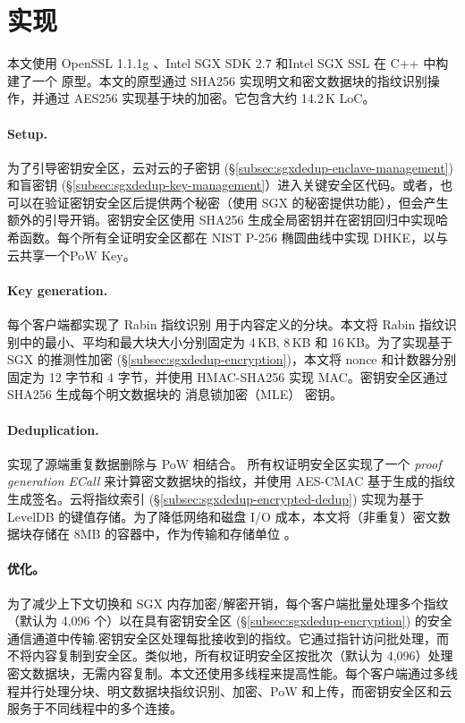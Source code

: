 \section{实现}
\label{sec:sgxdedup-implementation}

本文使用 OpenSSL 1.1.1g \cite{openssl}、Intel SGX SDK 2.7 \cite{sgx} 和Intel SGX SSL \cite{sgxssl} 在 C++ 中构建了一个 \sysnameS 原型。本文的原型通过 SHA256 实现明文和密文数据块的指纹识别操作，并通过 AES256 实现基于块的加密。它包含大约 14.2\,K LoC。

\paragraph*{Setup.} 
为了引导密钥安全区，云对云的子密钥 (\S\ref{subsec:sgxdedup-enclave-management}) 和盲密钥 (\S\ref{subsec:sgxdedup-key-management}）进入关键安全区代码。或者，\sysnameS 也可以在验证密钥安全区后提供两个秘密（使用 SGX \cite{sgx} 的秘密提供功能），但会产生额外的引导开销。密钥安全区使用 SHA256 生成全局密钥并在密钥回归中实现哈希函数。每个所有全证明安全区都在 NIST P-256 椭圆曲线中实现 DHKE，以与云共享一个PoW Key。

\paragraph*{Key generation.} 每个客户端都实现了 Rabin 指纹识别 \cite{rabin81} 用于内容定义的分块。本文将 Rabin 指纹识别中的最小、平均和最大块大小分别固定为 4\,KB, 8\,KB 和 16\,KB。为了实现基于 SGX 的推测性加密 (\S\ref{subsec:sgxdedup-encryption})，本文将 nonce 和计数器分别固定为 12 字节和 4 字节，并使用 HMAC-SHA256 实现 MAC。密钥安全区通过 SHA256 生成每个明文数据块的 消息锁加密（MLE） 密钥。

\paragraph*{Deduplication.} \sysnameS 实现了源端重复数据删除与 PoW 相结合。 所有权证明安全区实现了一个 \textit{ proof generation ECall} 来计算密文数据块的指纹，并使用 AES-CMAC 基于生成的指纹生成签名。云将指纹索引 (\S\ref{subsec:sgxdedup-encrypted-dedup}) 实现为基于 LevelDB \cite{leveldb} 的键值存储。为了降低网络和磁盘 I/O 成本，本文将（非重复）密文数据块存储在 8MB 的容器中，作为传输和存储单位 \cite{lillibridge13}。

\paragraph*{优化。} 为了减少上下文切换和 SGX 内存加密/解密开销，每个客户端批量处理多个指纹（默认为 4,096 个）以在具有密钥安全区 (\S\ref{subsec:sgxdedup-encryption}) 的安全通信通道中传输.密钥安全区处理每批接收到的指纹。它通过指针访问批处理，而不将内容复制到安全区\cite{harnik18}。类似地，所有权证明安全区按批次（默认为 4,096）处理密文数据块，无需内容复制。本文还使用多线程来提高性能。每个客户端通过多线程并行处理分块、明文数据块指纹识别、加密、PoW 和上传，而密钥安全区和云服务于不同线程中的多个连接。